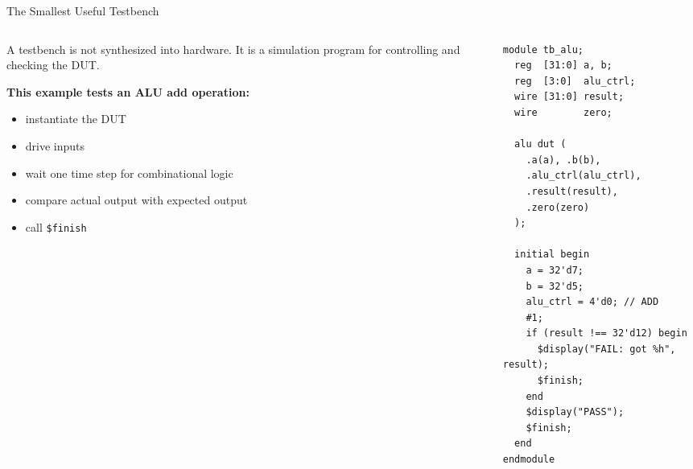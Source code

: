 \documentclass[aspectratio=169,10pt]{beamer}
\begin{document}
\begin{frame}[fragile]{The Smallest Useful Testbench}
  \begin{columns}[T]
    \begin{column}{0.49\textwidth}
      A testbench is not synthesized into hardware. It is a simulation program for controlling and checking the DUT.

      \vspace{0.6em}
      \textbf{This example tests an ALU add operation:}
      \begin{itemize}
        \item instantiate the DUT
        \item drive inputs
        \item wait one time step for combinational logic
        \item compare actual output with expected output
        \item call \texttt{\$finish}
      \end{itemize}
    \end{column}
    \begin{column}{0.47\textwidth}
\begin{lstlisting}
module tb_alu;
  reg  [31:0] a, b;
  reg  [3:0]  alu_ctrl;
  wire [31:0] result;
  wire        zero;

  alu dut (
    .a(a), .b(b),
    .alu_ctrl(alu_ctrl),
    .result(result),
    .zero(zero)
  );

  initial begin
    a = 32'd7;
    b = 32'd5;
    alu_ctrl = 4'd0; // ADD
    #1;
    if (result !== 32'd12) begin
      $display("FAIL: got %h", result);
      $finish;
    end
    $display("PASS");
    $finish;
  end
endmodule
\end{lstlisting}
    \end{column}
  \end{columns}
\end{frame}
\end{document}
